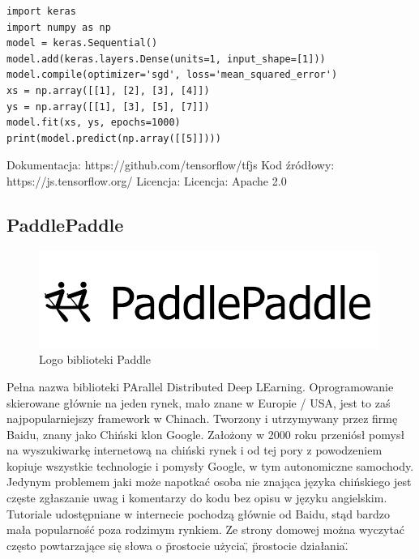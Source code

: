 \documentclass[12pt,a4paper,twoside,titlepage,openright]{book}
\begin{document}
\noindent
\begin{minipage}{\linewidth}
\begin{lstlisting}[caption=Prosty model w języku Python używając Keras, label=lst:test]
import keras
import numpy as np
model = keras.Sequential()
model.add(keras.layers.Dense(units=1, input_shape=[1]))
model.compile(optimizer='sgd', loss='mean_squared_error')
xs = np.array([[1], [2], [3], [4]])
ys = np.array([[1], [3], [5], [7]])
model.fit(xs, ys, epochs=1000)
print(model.predict(np.array([[5]])))
\end{lstlisting}
\end{minipage}

\noindent
\newline
Dokumentacja: https://github.com/tensorflow/tfjs
\newline
Kod źródłowy: https://js.tensorflow.org/
\newline
Licencja: Licencja: Apache 2.0

\subsection{PaddlePaddle}
\begin{figure}[h]
	\centering
			\includegraphics[resolution=100]{PaddlePaddle.png}
		\caption{Logo biblioteki Paddle}
\end{figure}
Pełna nazwa biblioteki PArallel Distributed Deep LEarning. Oprogramowanie skierowane głównie na jeden rynek, mało znane w Europie / USA, jest to zaś najpopularniejszy framework w Chinach. Tworzony i utrzymywany przez firmę Baidu, znany jako Chiński klon Google. Założony w 2000 roku przeniósł pomysł na wyszukiwarkę internetową na chiński rynek i od tej pory z powodzeniem kopiuje wszystkie technologie i pomysły Google, w tym autonomiczne samochody. Jedynym problemem jaki może napotkać osoba nie znająca języka chińskiego jest częste zgłaszanie uwag i komentarzy do kodu bez opisu w języku angielskim. Tutoriale udostępniane w internecie pochodzą głównie od Baidu, stąd bardzo mała popularność poza rodzimym rynkiem. Ze strony domowej można wyczytać często powtarzające się słowa o \"prostocie użycia\", \"prostocie działania\". 
\end{document}
